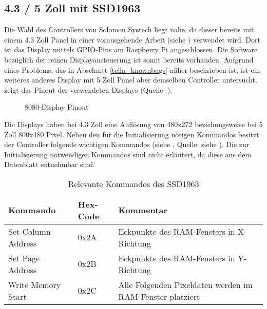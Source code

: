 \subsection{4.3 / 5 Zoll mit SSD1963}
Die Wahl des Controllers  von Solomon Systech liegt nahe, da dieser bereits mit einem 4.3 Zoll  Panel in einer vorausgehende Arbeit (siehe \cite{Schlegel2013a}) verwendet wird. Dort ist das Display mittels GPIO-Pins am Raspberry Pi angeschlossen. Die Software bezüglich der reinen Displayansteuerung ist somit bereits vorhanden. Aufgrund eines Problems, das in Abschnitt \ref{teila_knownbugs} näher beschrieben ist, ist ein weiteres anderes Display mit 5 Zoll Panel aber demselben Controller untersucht. 
 zeigt das Pinout der verwendeten Displays (Quelle: \cite{Coldtears2014}).
\begin{figure}[h]
	\centering
{}
	\caption{8080-Display Pinout}
	\label{fig:8080_pinout}
\end{figure}
Die Displays haben bei 4.3 Zoll eine Auflösung von 480x272 beziehungsweise bei 5 Zoll 800x480 Pixel. Neben den für die Initialisierung nötigen Kommandos besitzt der Controller folgende wichtigen Kommandos (siehe , Quelle: siehe \cite{SSD2008}). Die zur Initialisierung notwendigen Kommandos sind nicht erläutert, da diese aus dem Datenblatt entnehmbar sind.
\begin{table}[h]
\begin{tabular}{|p{4cm}|p{1cm}|p{8cm}|}\hline
\rowcolor{TableBackgroundColor} 
   \textbf{Kommando} & \textbf{Hex-Code} & \textbf{Kommentar}\\ \hline
   Set Column Address & 0x2A & Eckpunkte des RAM-Fensters in X-Richtung \\ \hline
   Set Page Address & 0x2B & Eckpunkte des RAM-Fensters in Y-Richtung \\ \hline
   Write Memory Start & 0x2C & Alle Folgenden Pixeldaten werden im RAM-Fenster platziert \\ \hline
\end{tabular}
\caption{Relevante Kommandos des SSD1963}
\label{tab:Kommandos_SSD1963}
\end{table}
